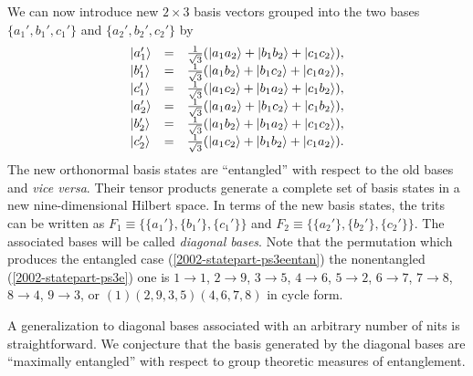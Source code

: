 We can now introduce new $2\times 3$  basis vectors  grouped into the two bases
$\{a_1',b_1',c_1'\}$
and
$\{a_2',b_2',c_2'\}$ by
\begin{equation}
\begin{array}{llll}
\vert a_1'  \rangle &=&{1\over \sqrt{3}}
   (\vert a_1a_2\rangle +  \vert b_1b_2\rangle  + \vert c_1c_2\rangle )
,\\
\vert b_1'  \rangle &=&{1\over \sqrt{3}}
   (\vert a_1b_2\rangle +  \vert b_1c_2\rangle  + \vert c_1a_2\rangle )
,\\
\vert c_1'  \rangle &=&{1\over \sqrt{3}}
   (\vert a_1c_2\rangle +  \vert b_1a_2\rangle  + \vert c_1b_2\rangle )
,\\
\vert a_2'  \rangle &=&{1\over \sqrt{3}}
   (\vert a_1a_2\rangle +  \vert b_1c_2\rangle  + \vert c_1b_2\rangle )
,\\
\vert b_2'  \rangle &=&{1\over \sqrt{3}}
   (\vert a_1b_2\rangle +  \vert b_1a_2\rangle  + \vert c_1c_2\rangle )
,\\
\vert c_2'  \rangle &=&{1\over \sqrt{3}}
   (\vert a_1c_2\rangle +  \vert b_1b_2\rangle  + \vert c_1a_2\rangle )
.
\end{array}
\label{2002-statepart-notb}
\end{equation}
The new orthonormal basis states are ``entangled'' with respect to the old bases
and {\em vice versa}.
Their tensor products generate a complete set of basis states in a new
nine-dimensional Hilbert space.
In terms of the new basis states, the trits can be written as
$F_1\equiv \{\{a_1'\},\{b_1'\},\{c_1'\}\}$
and
$F_2\equiv \{\{a_2'\},\{b_2'\},\{c_2'\}\}$.
The associated bases will be called {\em diagonal bases}.
Note that the permutation which produces the entangled case
(\ref{2002-statepart-ps3eentan})
the nonentangled
(\ref{2002-statepart-ps3e})
one is
$1\rightarrow 1$,
$2\rightarrow 9$,
$3\rightarrow 5$,
$4\rightarrow 6$,
$5\rightarrow 2$,
$6\rightarrow 7$,
$7\rightarrow 8$,
$8\rightarrow 4$,
$9\rightarrow 3$, or $(1)(2,9,3,5)(4,6,7,8)$ in cycle form.


A generalization to diagonal bases associated with
an arbitrary number of nits is straightforward.
We conjecture that the  basis generated by the diagonal  bases are
``maximally entangled'' with respect to group theoretic measures of entanglement.




